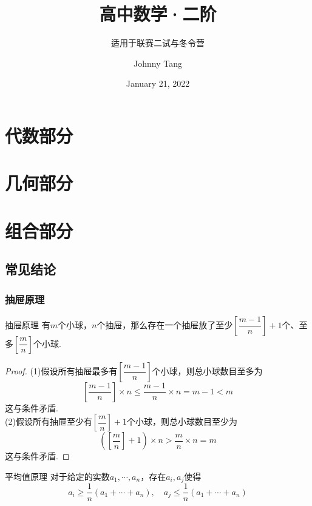 \documentclass[lang=cn, zihao=4.5]{elegantbook}
\title{高中数学·二阶}
\subtitle{适用于联赛二试与冬令营}
\author{Johnny Tang}
\institute{DEEP Team}
\date{January 21, 2022}
\newcommand{\ssb}[1]{\left( #1 \right)}
\begin{document}
\maketitle

\frontmatter

\mainmatter

\tableofcontents

\newpage

\part{代数部分}

\part{几何部分}

\part{组合部分}

\chapter{常见结论}

\section{抽屉原理}

\begin{theorem}{抽屉原理}
	有$m$个小球，$n$个抽屉，那么存在一个抽屉放了至少$\left[ \dfrac{m-1}{n} \right]+1$个、至多$\left[ \dfrac{m}{n} \right]$个小球.
\end{theorem}
\begin{proof}
	(1)假设所有抽屉最多有$\left[ \dfrac{m-1}{n} \right]$个小球，则总小球数目至多为$$\left[ \frac{m-1}{n} \right] \times n \leq \frac{m-1}{n} \times n = m-1 < m$$
	这与条件矛盾. \\
	(2)假设所有抽屉至少有$\left[ \dfrac{m}{n} \right] + 1$个小球，则总小球数目至少为$$\ssb{\left[ \dfrac{m}{n} \right] + 1} \times n > \frac{m}{n} \times n = m$$
	这与条件矛盾.
\end{proof}

\begin{corollary}{平均值原理}
	对于给定的实数$a_1, \cdots ,a_n$，存在$a_i,a_j$使得$$a_i \geq \dfrac{1}{n}(a_1+ \cdots +a_n), \quad a_j \leq \dfrac{1}{n}(a_1+ \cdots +a_n)$$
\end{corollary}
\end{document}
